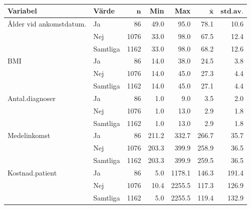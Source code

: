 \begin{table}[htbp]
\centering
\caption{}
\label{}
{\footnotesize
\begin{tabular}{llrrrrr}
 \textbf{Variabel} & \textbf{Värde} & $\mathbf{n}$ & \textbf{Min} & \textbf{Max} & $\mathbf{\bar{x}}$ & $\mathbf{std.av.}$ \\ 
  \hline
Ålder vid ankomstdatum. & Ja &   86 &  49.0 &   95.0 &  78.1 &  10.6 \\ 
   & Nej & 1076 &  33.0 &   98.0 &  67.5 &  12.4 \\ 
   \hline
 & Samtliga & 1162 &  33.0 &   98.0 &  68.2 &  12.6 \\ 
   \hline
BMI & Ja &   86 &  14.0 &   38.0 &  24.5 &   3.8 \\ 
   & Nej & 1076 &  14.0 &   45.0 &  27.3 &   4.4 \\ 
   \hline
 & Samtliga & 1162 &  14.0 &   45.0 &  27.1 &   4.4 \\ 
   \hline
Antal.diagnoser & Ja &   86 &   1.0 &    9.0 &   3.5 &   2.0 \\ 
   & Nej & 1076 &   1.0 &   13.0 &   2.9 &   1.8 \\ 
   \hline
 & Samtliga & 1162 &   1.0 &   13.0 &   2.9 &   1.8 \\ 
   \hline
Medelinkomst & Ja &   86 & 211.2 &  332.7 & 266.7 &  35.7 \\ 
   & Nej & 1076 & 203.3 &  399.9 & 258.9 &  36.5 \\ 
   \hline
 & Samtliga & 1162 & 203.3 &  399.9 & 259.5 &  36.5 \\ 
   \hline
Kostnad.patient & Ja &   86 &   5.0 & 1178.1 & 146.3 & 191.4 \\ 
   & Nej & 1076 &  10.4 & 2255.5 & 117.3 & 126.9 \\ 
   \hline
 & Samtliga & 1162 &   5.0 & 2255.5 & 119.4 & 132.9 \\ 
   \hline
\end{tabular}
}
\end{table}


